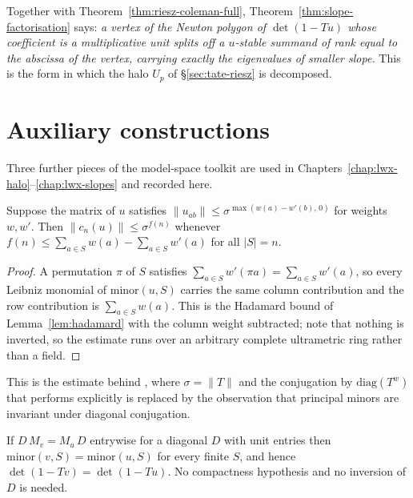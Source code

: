 Together with Theorem~\ref{thm:riesz-coleman-full}, Theorem~\ref{thm:slope-factorisation} says:
\emph{a vertex of the Newton polygon of $\det(1-Tu)$ whose coefficient is a multiplicative unit
splits off a $u$-stable summand of rank equal to the abscissa of the vertex, carrying exactly
the eigenvalues of smaller slope.}  This is the form in which the halo $U_p$ of
\S\ref{sec:tate-riesz} is decomposed.

\section{Auxiliary constructions}

Three further pieces of the model-space toolkit are used in
Chapters~\ref{chap:lwx-halo}--\ref{chap:lwx-slopes} and recorded here.

\begin{lemma}
  \label{lem:two-sided}
  \leanok
  Suppose the matrix of $u$ satisfies $\lVert u_{ab}\rVert \leq \sigma^{\max(w(a) - w'(b),\,0)}$
  for weights $w, w'$.  Then $\lVert c_n(u)\rVert \leq \sigma^{f(n)}$ whenever
  $f(n) \leq \sum_{a\in S} w(a) - \sum_{a \in S} w'(a)$ for all $\lvert S\rvert = n$.
\end{lemma}

\begin{proof}
  \leanok
  A permutation $\pi$ of $S$ satisfies $\sum_{a\in S} w'(\pi a) = \sum_{a \in S} w'(a)$, so every
  Leibniz monomial of $\mathrm{minor}(u,S)$ carries the same column contribution and the row
  contribution is $\sum_{a\in S}w(a)$.  This is the Hadamard bound of Lemma~\ref{lem:hadamard}
  with the column weight subtracted; note that nothing is inverted, so the estimate runs over an
  arbitrary complete ultrametric ring rather than a field.
\end{proof}

This is the estimate behind \cite[Theorem 3.16]{LWX}, where $\sigma = \lVert T\rVert$ and the
conjugation by $\mathrm{diag}(T^{w})$ that \cite{LWX} performs explicitly is replaced by the
observation that principal minors are invariant under diagonal conjugation.

\begin{lemma}
  \label{lem:diag-intertwine}
  \leanok
  If $D\,M_v = M_u\,D$ entrywise for a diagonal $D$ with unit entries then
  $\mathrm{minor}(v,S) = \mathrm{minor}(u,S)$ for every finite $S$, and hence
  $\det(1-Tv) = \det(1-Tu)$.  No compactness hypothesis and no inversion of $D$ is needed.
\end{lemma}

